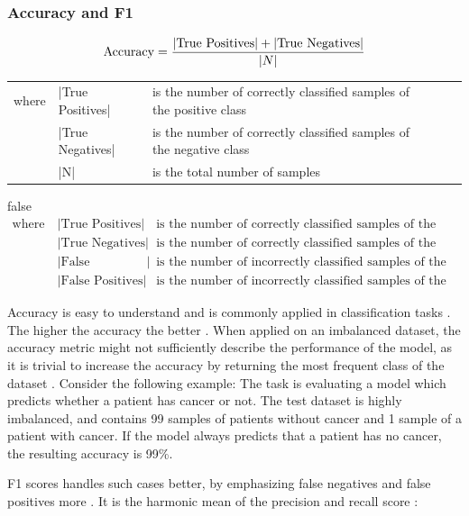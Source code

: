 \documentclass[draft,final,oneside]{vutinfth} %
\begin{document}
\subsubsection{Accuracy and F1}
\begin{equation}
\text{Accuracy}=\frac{|\text{True Positives}| + |\text{True Negatives}|} {|N|}\\
\end{equation}
\FloatBarrier
\begin{table}[h]
\begin{tabular}{lllll}
where & |True Positives| & is the number of correctly classified samples of the positive class \\
 & |True Negatives| & is the number of correctly classified samples of the negative class \\
 & |N| & is the total number of samples
\end{tabular}
\end{table}
\FloatBarrier
\if false
\begin{align*}
\text{where}~&|\text{True Positives}|&~\text{is the number of correctly classified samples of the positive class} \\
&|\text{True Negatives}|&~\text{is the number of correctly classified samples of the negative class} \\
&|\text{False Negatives}|&~\text{is the number of incorrectly classified samples of the negative class} \\
&|\text{False Positives}|&~\text{is the number of incorrectly classified samples of the positive class}
\end{align*}
\fi

Accuracy is easy to understand and is commonly applied in classification tasks \cite{accuracy}. The higher the accuracy the better \cite{Powers2008EvaluationFP}. When applied on an imbalanced dataset, the accuracy metric might not sufficiently describe the performance of the model, as it is trivial to increase the accuracy by returning the most frequent class of the dataset \cite{accuracy}. Consider the following example: The task is evaluating a model which predicts whether a patient has cancer or not. The test dataset is highly imbalanced, and contains 99 samples of patients without cancer and 1 sample of a patient with cancer. If the model always predicts that a patient has no cancer, the resulting accuracy is 99\%. 

\pagebreak

F1 scores handles such cases better, by emphasizing false negatives and false positives more \cite{Powers2008EvaluationFP}. It is the harmonic mean of the precision and recall score \cite{Powers2008EvaluationFP}:
\end{document}
